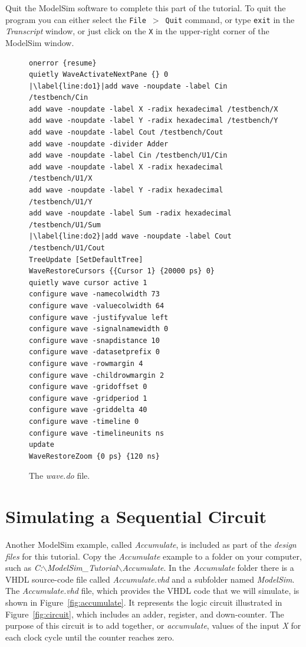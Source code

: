 \documentclass[11pt, twoside, pdftex]{article}
\begin{document}
\noindent
Quit the ModelSim software to complete this part of the tutorial. To quit the program you 
can either select the \texttt{File}~$>$~\texttt{Quit} command, or 
type \texttt{exit} in the {\it Transcript}
window, or just click on the \texttt{X} in the upper-right corner of the ModelSim window.

\lstset{numbers=left,escapechar=|}
\begin{figure}[h!]
\begin{center}
\begin{minipage}[h!]{14.5 cm}
\begin{lstlisting}[name=do]
onerror {resume}
quietly WaveActivateNextPane {} 0
|\label{line:do1}|add wave -noupdate -label Cin /testbench/Cin
add wave -noupdate -label X -radix hexadecimal /testbench/X
add wave -noupdate -label Y -radix hexadecimal /testbench/Y
add wave -noupdate -label Cout /testbench/Cout
add wave -noupdate -divider Adder
add wave -noupdate -label Cin /testbench/U1/Cin
add wave -noupdate -label X -radix hexadecimal /testbench/U1/X
add wave -noupdate -label Y -radix hexadecimal /testbench/U1/Y
add wave -noupdate -label Sum -radix hexadecimal /testbench/U1/Sum
|\label{line:do2}|add wave -noupdate -label Cout /testbench/U1/Cout
TreeUpdate [SetDefaultTree]
WaveRestoreCursors {{Cursor 1} {20000 ps} 0}
quietly wave cursor active 1
configure wave -namecolwidth 73
configure wave -valuecolwidth 64
configure wave -justifyvalue left
configure wave -signalnamewidth 0
configure wave -snapdistance 10
configure wave -datasetprefix 0
configure wave -rowmargin 4
configure wave -childrowmargin 2
configure wave -gridoffset 0
configure wave -gridperiod 1
configure wave -griddelta 40
configure wave -timeline 0
configure wave -timelineunits ns
update
WaveRestoreZoom {0 ps} {120 ns}
\end{lstlisting}
\end{minipage}
\caption{The {\it wave.do} file.}
\label{fig:do}
\end{center}
\end{figure}

\section{Simulating a Sequential Circuit}

Another ModelSim example, called {\it Accumulate}, is included as part of the
{\it design files} for this tutorial. Copy the {\it Accumulate} example to 
a folder on your computer, such as 
{\it C:$\backslash$ModelSim\_Tutorial$\backslash$Accumulate}. In the {\it Accumulate} folder
there is a VHDL source-code file called {\it Accumulate.vhd} and a subfolder named 
{\it ModelSim}. The {\it Accumulate.vhd} file, which provides the VHDL code that we will 
simulate, is shown in Figure~\ref{fig:accumulate}. It
represents the logic circuit illustrated in Figure~\ref{fig:circuit}, which includes an
adder, register, and down-counter. The purpose of this circuit is to add together, or
{\it accumulate}, values of the input {\it X} for each clock cycle until the counter 
reaches zero. 
\end{document}
